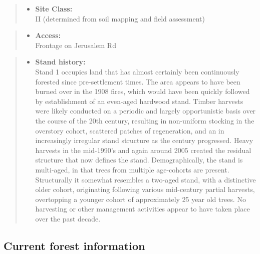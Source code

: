 \documentclass[]{tufte-handout}
\providecommand{\tightlist}{%
  \setlength{\itemsep}{0pt}\setlength{\parskip}{0pt}}
\begin{document}
\begin{quote}
\begin{itemize}
\tightlist
\item
  \textbf{Site Class:}\\
  \vspace{2pt} II (determined from soil mapping and field assessment)
\end{itemize}
\end{quote}

\begin{quote}
\begin{itemize}
\tightlist
\item
  \textbf{Access:}\\
  \vspace{2pt} Frontage on Jerusalem Rd
\end{itemize}
\end{quote}

\begin{quote}
\begin{itemize}
\tightlist
\item
  \textbf{Stand history:}\\
  \vspace{2pt} Stand 1 occupies land that has almost certainly been
  continuously forested since pre-settlement times. The area appears to
  have been burned over in the 1908 fires, which would have been quickly
  followed by establishment of an even-aged hardwood stand. Timber
  harvests were likely conducted on a periodic and largely opportunistic
  basis over the course of the 20th century, resulting in non-uniform
  stocking in the overstory cohort, scattered patches of regeneration,
  and an in increasingly irregular stand structure as the century
  progressed. Heavy harvests in the mid-1990's and again around 2005
  created the residual structure that now defines the stand.
  Demographically, the stand is multi-aged, in that trees from multiple
  age-cohorts are present. Structurally it somewhat resembles a two-aged
  stand, with a distinctive older cohort, originating following various
  mid-century partial harvests, overtopping a younger cohort of
  approximately 25 year old trees. No harvesting or other management
  activities appear to have taken place over the past decade.
\end{itemize}
\end{quote}

\subsection{Current forest
information}\label{current-forest-information}
\end{document}
